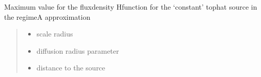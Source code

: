 \documentclass[letterpaper,10pt,english]{sphinxmanual}
\begin{document}
\begin{fulllineitems}
\label{\detokenize{diffsph.profiles:diffsph.profiles.analytics.cofdAmax}}
\pysigstartsignatures
{}
\pysigstopsignatures
\sphinxAtStartPar
Maximum value for the flux\sphinxhyphen{}density H\sphinxhyphen{}function for the ‘constant’ top\sphinxhyphen{}hat source in the regime\sphinxhyphen{}A approximation
\begin{quote}\begin{description}
\begin{itemize}
\item {} 
\sphinxAtStartPar
{} \textendash{} scale radius

\item {} 
\sphinxAtStartPar
{} \textendash{} diffusion radius parameter

\item {} 
\sphinxAtStartPar
{} \textendash{} distance to the source

\end{itemize}

\end{description}\end{quote}

\end{fulllineitems}

\end{document}

